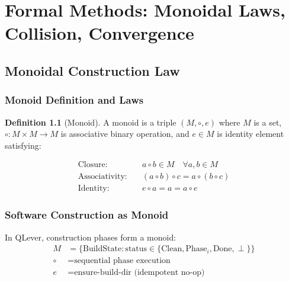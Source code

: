 \documentclass[12pt,oneside,a4paper]{book}
\theoremstyle{definition}
\newtheorem{definition}{Definition}[chapter]
\begin{document}

\part{Formal Methods: Monoidal Laws, Collision, Convergence}
\label{part:formal}

\chapter{Monoidal Construction Law}
\label{ch:monoidal-law}


\section{Monoid Definition and Laws}
\label{sec:monoid-definition}

\begin{definition}[Monoid]
A monoid is a triple $(M, \circ, e)$ where $M$ is a set, $\circ: M \times M \to M$
is associative binary operation, and $e \in M$ is identity element satisfying:

\begin{align}
  \text{Closure:} \quad &a \circ b \in M \quad \forall a,b \in M \\
  \text{Associativity:} \quad &(a \circ b) \circ c = a \circ (b \circ c) \\
  \text{Identity:} \quad &e \circ a = a = a \circ e
\end{align}
\end{definition}

\section{Software Construction as Monoid}
\label{sec:construction-monoid}

In QLever, construction phases form a monoid:
\begin{align}
  M &= \{\text{BuildState} : \text{status} \in \{\text{Clean}, \text{Phase}_i, \text{Done}, \perp\}\} \\
  \circ &= \text{sequential phase execution} \\
  e &= \text{ensure-build-dir (idempotent no-op)}
\end{align}
\end{document}
